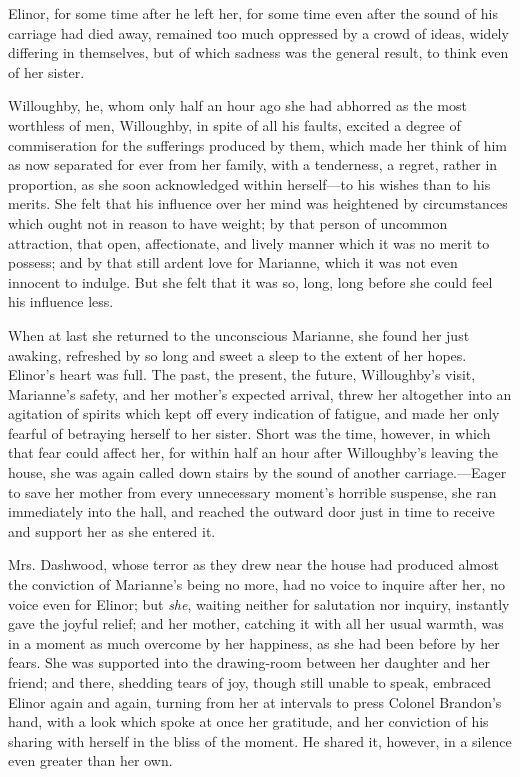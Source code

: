 Elinor, for some time after he left her, for some time even after the sound of his carriage had died away, remained too much oppressed by a crowd of ideas, widely differing in themselves, but of which sadness was the general result, to think even of her sister.

Willoughby, he, whom only half an hour ago she had abhorred as the most worthless of men, Willoughby, in spite of all his faults, excited a degree of commiseration for the sufferings produced by them, which made her think of him as now separated for ever from her family, with a tenderness, a regret, rather in proportion, as she soon acknowledged within herself---to his wishes than to his merits. She felt that his influence over her mind was heightened by circumstances which ought not in reason to have weight; by that person of uncommon attraction, that open, affectionate, and lively manner which it was no merit to possess; and by that still ardent love for Marianne, which it was not even innocent to indulge. But she felt that it was so, long, long before she could feel his influence less.

When at last she returned to the unconscious Marianne, she found her just awaking, refreshed by so long and sweet a sleep to the extent of her hopes. Elinor's heart was full. The past, the present, the future, Willoughby's visit, Marianne's safety, and her mother's expected arrival, threw her altogether into an agitation of spirits which kept off every indication of fatigue, and made her only fearful of betraying herself to her sister. Short was the time, however, in which that fear could affect her, for within half an hour after Willoughby's leaving the house, she was again called down stairs by the sound of another carriage.---Eager to save her mother from every unnecessary moment's horrible suspense, she ran immediately into the hall, and reached the outward door just in time to receive and support her as she entered it.

Mrs. Dashwood, whose terror as they drew near the house had produced almost the conviction of Marianne's being no more, had no voice to inquire after her, no voice even for Elinor; but {\em she}, waiting neither for salutation nor inquiry, instantly gave the joyful relief; and her mother, catching it with all her usual warmth, was in a moment as much overcome by her happiness, as she had been before by her fears. She was supported into the drawing-room between her daughter and her friend; and there, shedding tears of joy, though still unable to speak, embraced Elinor again and again, turning from her at intervals to press Colonel Brandon's hand, with a look which spoke at once her gratitude, and her conviction of his sharing with herself in the bliss of the moment. He shared it, however, in a silence even greater than her own.


